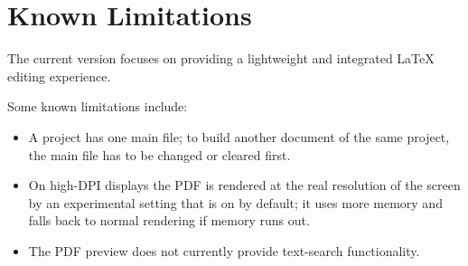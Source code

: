 \section{Known Limitations}

The current version focuses on providing a lightweight
and integrated LaTeX editing experience.

Some known limitations include:

\begin{itemize}[noitemsep]
    \item A project has one main file; to build another
    document of the same project, the main file has to be changed
    or cleared first.
    \item On high-DPI displays the PDF is rendered at the real
    resolution of the screen by an experimental setting that is
    on by default; it uses more memory and falls back to normal
    rendering if memory runs out.
    \item The PDF preview does not currently provide
    text-search functionality.
\end{itemize}

